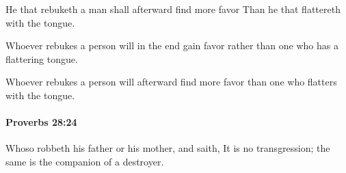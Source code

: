 			\begin{versebox}
					\item[BHS] 
					\item[ASV] He that rebuketh a man shall afterward find more favor Than he that flattereth with the tongue.
					\item[NIV] Whoever rebukes a person will in the end gain favor rather than one who has a flattering tongue.
					\item[NRSV] Whoever rebukes a person will afterward find more favor than one who flatters with the tongue.
			\end{versebox}

		\paragraph{Proverbs 28:24} %
			\label{PROVERBS-28-24}

			Whoso robbeth his father or his mother, and saith, It is no transgression; the same is the companion of a destroyer.

